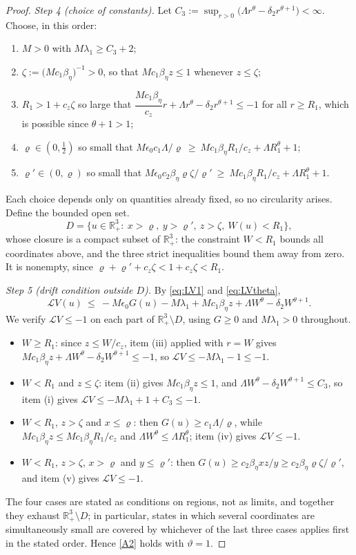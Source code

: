 \documentclass{article}
\newcommand{\betaeta}{\beta_\eta}
\begin{document}
\begin{proof}
\emph{Step 4 (choice of constants).} Let $C_3:=\sup_{r>0}\big(\Lambda r^\theta-\delta_2r^{\theta+1}\big)<\infty$. Choose, in this order:
\begin{enumerate}
\item[(i)] $M>0$ with $M\lambda_1\ge C_3+2$;
\item[(ii)] $\zeta:=\big(Mc_1\betaeta\big)^{-1}>0$, so that $Mc_1\betaeta z\le1$ whenever $z\le\zeta$;
\item[(iii)] $R_1>1+c_z\zeta$ so large that $\dfrac{Mc_1\betaeta}{c_z}r+\Lambda r^\theta-\delta_2r^{\theta+1}\le-1$ for all $r\ge R_1$, which is possible since $\theta+1>1$;
\item[(iv)] $\varrho\in(0,\tfrac12)$ so small that $M\epsilon_0c_1\Lambda/\varrho\ \ge\ Mc_1\betaeta R_1/c_z+\Lambda R_1^{\theta}+1$;
\item[(v)] $\varrho'\in(0,\varrho)$ so small that $M\epsilon_0c_2\betaeta\varrho\zeta/\varrho'\ \ge\ Mc_1\betaeta R_1/c_z+\Lambda R_1^{\theta}+1$.
\end{enumerate}
Each choice depends only on quantities already fixed, so no circularity arises. Define the bounded open set.
\[
D=\big\{u\in\mathbb{R}^3_+:\ x>\varrho,\ y>\varrho',\ z>\zeta,\ W(u)<R_1\big\},
\]
whose closure is a compact subset of $\mathbb{R}^3_+$: the constraint $W<R_1$ bounds all coordinates above, and the three strict inequalities bound them away from zero. It is nonempty, since $\varrho+\varrho'+c_z\zeta<1+c_z\zeta<R_1$.

\emph{Step 5 (drift condition outside $D$).} By \eqref{eq:LV1} and \eqref{eq:LVtheta},
\begin{equation}\label{eq:LVfull}
\mathcal{L}V(u)\ \le\ -M\epsilon_0G(u)-M\lambda_1+Mc_1\betaeta z+\Lambda W^\theta-\delta_2W^{\theta+1}.
\end{equation}
We verify $\mathcal{L}V\le-1$ on each part of $\mathbb{R}^3_+\setminus D$, using $G\ge0$ and $M\lambda_1>0$ throughout.
\begin{itemize}
\item $W\ge R_1$: since $z\le W/c_z$, item (iii) applied with $r=W$ gives $Mc_1\betaeta z+\Lambda W^\theta-\delta_2W^{\theta+1}\le-1$, so $\mathcal{L}V\le-M\lambda_1-1\le-1$.
\item $W<R_1$ and $z\le\zeta$: item (ii) gives $Mc_1\betaeta z\le1$, and $\Lambda W^\theta-\delta_2W^{\theta+1}\le C_3$, so item (i) gives $\mathcal{L}V\le-M\lambda_1+1+C_3\le-1$.
\item $W<R_1$, $z>\zeta$ and $x\le\varrho$: then $G(u)\ge c_1\Lambda/\varrho$, while $Mc_1\betaeta z\le Mc_1\betaeta R_1/c_z$ and $\Lambda W^\theta\le\Lambda R_1^\theta$; item (iv) gives $\mathcal{L}V\le-1$.
\item $W<R_1$, $z>\zeta$, $x>\varrho$ and $y\le\varrho'$: then $G(u)\ge c_2\betaeta xz/y\ge c_2\betaeta\varrho\zeta/\varrho'$, and item (v) gives $\mathcal{L}V\le-1$.
\end{itemize}
The four cases are stated as conditions on regions, not as limits, and together they exhaust $\mathbb{R}^3_+\setminus D$; in particular, states in which several coordinates are simultaneously small are covered by whichever of the last three cases applies first in the stated order. Hence \eqref{A2} holds with $\vartheta=1$.


\end{proof}
\end{document}
